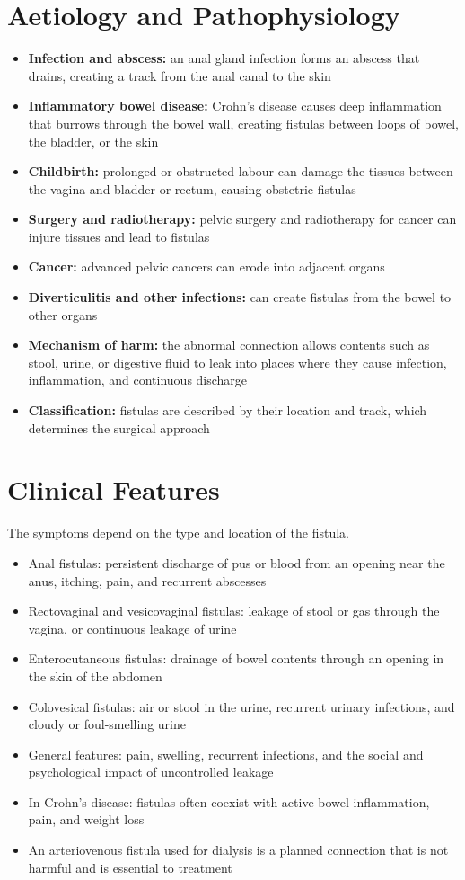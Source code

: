 \section*{Aetiology and Pathophysiology}
\begin{itemize}
    \item \textbf{Infection and abscess:} an anal gland infection forms an abscess that drains, creating a track from the anal canal to the skin
    \item \textbf{Inflammatory bowel disease:} Crohn's disease causes deep inflammation that burrows through the bowel wall, creating fistulas between loops of bowel, the bladder, or the skin
    \item \textbf{Childbirth:} prolonged or obstructed labour can damage the tissues between the vagina and bladder or rectum, causing obstetric fistulas
    \item \textbf{Surgery and radiotherapy:} pelvic surgery and radiotherapy for cancer can injure tissues and lead to fistulas
    \item \textbf{Cancer:} advanced pelvic cancers can erode into adjacent organs
    \item \textbf{Diverticulitis and other infections:} can create fistulas from the bowel to other organs
    \item \textbf{Mechanism of harm:} the abnormal connection allows contents such as stool, urine, or digestive fluid to leak into places where they cause infection, inflammation, and continuous discharge
    \item \textbf{Classification:} fistulas are described by their location and track, which determines the surgical approach
\end{itemize}

\section*{Clinical Features}
The symptoms depend on the type and location of the fistula.
\begin{itemize}
    \item Anal fistulas: persistent discharge of pus or blood from an opening near the anus, itching, pain, and recurrent abscesses
    \item Rectovaginal and vesicovaginal fistulas: leakage of stool or gas through the vagina, or continuous leakage of urine
    \item Enterocutaneous fistulas: drainage of bowel contents through an opening in the skin of the abdomen
    \item Colovesical fistulas: air or stool in the urine, recurrent urinary infections, and cloudy or foul-smelling urine
    \item General features: pain, swelling, recurrent infections, and the social and psychological impact of uncontrolled leakage
    \item In Crohn's disease: fistulas often coexist with active bowel inflammation, pain, and weight loss
    \item An arteriovenous fistula used for dialysis is a planned connection that is not harmful and is essential to treatment
\end{itemize}

